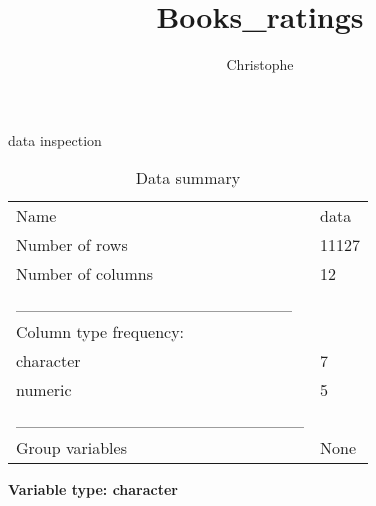 \documentclass[
]{article}
\title{Books\_ratings}
\author{Christophe}
\date{}
\begin{document}
\maketitle

{
\setcounter{tocdepth}{2}
\tableofcontents
}
data inspection

\begin{longtable}[]{@{}ll@{}}
\caption{Data summary}\tabularnewline
\toprule()
\endhead
Name & data \\
Number of rows & 11127 \\
Number of columns & 12 \\
\_\_\_\_\_\_\_\_\_\_\_\_\_\_\_\_\_\_\_\_\_\_\_ & \\
Column type frequency: & \\
character & 7 \\
numeric & 5 \\
\_\_\_\_\_\_\_\_\_\_\_\_\_\_\_\_\_\_\_\_\_\_\_\_ & \\
Group variables & None \\
\bottomrule()
\end{longtable}

\textbf{Variable type: character}
\end{document}
